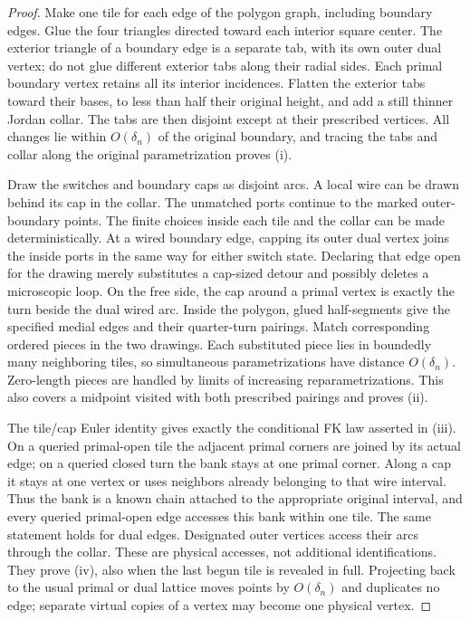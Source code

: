 \begin{proof}
Make one tile for each edge of the polygon graph, including boundary
edges.  Glue the four triangles directed toward each interior square
center.  The exterior triangle of a boundary edge is a separate tab,
with its own outer dual vertex; do not glue different exterior tabs
along their radial sides.  Each primal boundary vertex retains all
its interior incidences.  Flatten the exterior tabs toward their
bases, to less than half their original height, and add a still
thinner Jordan collar.  The tabs are then disjoint except at their
prescribed vertices.  All changes lie within $O(\delta_n)$ of the
original boundary, and tracing the tabs and collar along the original
parametrization proves (i).

Draw the switches and boundary caps as disjoint arcs.  A local wire
can be drawn behind its cap in the collar.  The unmatched ports
continue to the marked outer-boundary points.  The finite choices
inside each tile and the collar can be made deterministically.
At a wired boundary edge, capping its outer dual vertex joins the
inside ports in the same way for either switch state.  Declaring that
edge open for the drawing merely substitutes a cap-sized detour and
possibly deletes a microscopic loop.  On the free side, the cap
around a primal vertex is exactly the turn beside the dual wired
arc.  Inside the polygon, glued half-segments give the specified
medial edges and their quarter-turn pairings.  Match corresponding
ordered pieces in the two drawings.  Each substituted piece lies in
boundedly many neighboring tiles, so simultaneous parametrizations
have distance $O(\delta_n)$.  Zero-length pieces are handled by limits
of increasing reparametrizations.  This also covers a midpoint visited
with both prescribed pairings and proves (ii).

The tile/cap Euler identity gives exactly the conditional FK law
asserted in (iii).  On a queried primal-open tile the adjacent primal
corners are joined by its actual edge; on a queried closed turn the
bank stays at one primal corner.  Along a cap it stays at one vertex
or uses neighbors already belonging to that wire interval.  Thus the
bank is a known chain attached to the appropriate original interval,
and every queried primal-open edge accesses this bank within one tile.
The same statement holds for dual edges.  Designated outer vertices
access their arcs through the collar.  These are physical accesses,
not additional identifications.  They prove (iv), also when the last
begun tile is revealed in full.  Projecting back to the usual primal
or dual lattice moves points by $O(\delta_n)$ and duplicates no edge;
separate virtual copies of a vertex may become one physical vertex.
\end{proof}

